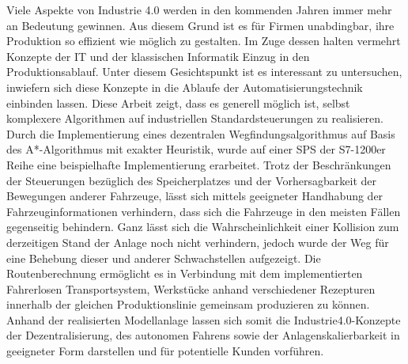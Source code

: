 	Viele Aspekte von Industrie 4.0 werden in den kommenden Jahren immer mehr an Bedeutung gewinnen. Aus diesem Grund ist es für Firmen unabdingbar, ihre Produktion so effizient wie möglich zu gestalten. Im Zuge dessen halten vermehrt Konzepte der IT und der klassischen Informatik Einzug in den Produktionsablauf. Unter diesem Gesichtspunkt ist es interessant zu untersuchen, inwiefern sich diese Konzepte in die Ablaufe der Automatisierungstechnik einbinden lassen. Diese Arbeit zeigt, dass es generell möglich ist, selbst komplexere Algorithmen auf industriellen Standardsteuerungen zu realisieren. Durch die Implementierung eines dezentralen Wegfindungsalgorithmus auf Basis des A*-Algorithmus mit exakter Heuristik, wurde auf einer \ac{SPS} der S7-1200er Reihe eine beispielhafte Implementierung erarbeitet. Trotz der Beschränkungen der Steuerungen bezüglich des Speicherplatzes und der Vorhersagbarkeit der Bewegungen anderer Fahrzeuge, lässt sich mittels geeigneter Handhabung der Fahrzeuginformationen verhindern, dass sich die Fahrzeuge in den meisten Fällen gegenseitig behindern. Ganz lässt sich die Wahrscheinlichkeit einer Kollision zum derzeitigen Stand der Anlage noch nicht verhindern, jedoch wurde der Weg für eine Behebung dieser und anderer Schwachstellen aufgezeigt. Die Routenberechnung ermöglicht es in Verbindung mit dem implementierten Fahrerlosen Transportsystem, Werkstücke anhand verschiedener Rezepturen innerhalb der gleichen Produktionslinie gemeinsam produzieren zu können. Anhand der realisierten Modellanlage lassen sich somit die Industrie4.0-Konzepte der Dezentralisierung, des autonomen Fahrens sowie der Anlagenskalierbarkeit in geeigneter Form darstellen und für potentielle Kunden vorführen.
	
	
